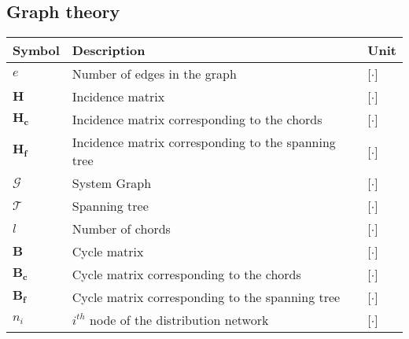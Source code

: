 \subsection*{Graph theory}

\begin{tabular}{l l l} 
	\textbf{Symbol}		&	\textbf{Description}										& \textbf{Unit}	\\\hline
	$e$					&	Number of edges in the graph							    & [$\cdot$]\\	
	$\bm{H}$			&	Incidence matrix									    	& [$\cdot$]\\
	$\bm{H_c}$			&	Incidence matrix corresponding to the chords		    	& [$\cdot$]\\
	$\bm{H_f}$			&	Incidence matrix corresponding to the spanning tree			& [$\cdot$]\\
	$\mathcal{G}$		&	System Graph												& [$\cdot$]\\
	$\mathcal{T}$		&	Spanning tree												& [$\cdot$]\\
	$l$					&	Number of chords											& [$\cdot$]\\
	$\bm{B}$			&	Cycle matrix 												& [$\cdot$]\\
	$\bm{B_c}$			&	Cycle matrix corresponding to the chords				    & [$\cdot$]\\
	$\bm{B_f}$			&	Cycle matrix corresponding to the spanning tree				& [$\cdot$]\\
	$n_i$				&	$i^{th}$ node of the distribution network     				& [$\cdot$]\\

\end{tabular}	

\newpage
